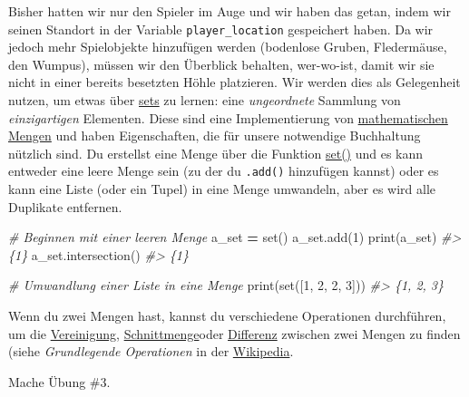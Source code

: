 \documentclass[
]{book}
\newenvironment{Shaded}{\begin{snugshade}}{\end{snugshade}}
\newcommand{\BuiltInTok}[1]{#1}
\newcommand{\CommentTok}[1]{\textcolor[rgb]{0.56,0.35,0.01}{\textit{#1}}}
\newcommand{\DecValTok}[1]{\textcolor[rgb]{0.00,0.00,0.81}{#1}}
\newcommand{\NormalTok}[1]{#1}
\newcommand{\OperatorTok}[1]{\textcolor[rgb]{0.81,0.36,0.00}{\textbf{#1}}}
\begin{document}
Bisher hatten wir nur den Spieler im Auge und wir haben das getan, indem wir seinen Standort in der Variable \texttt{player\_location} gespeichert haben. Da wir jedoch mehr Spielobjekte hinzufügen werden (bodenlose Gruben, Fledermäuse, den Wumpus), müssen wir den Überblick behalten, wer-wo-ist, damit wir sie nicht in einer bereits besetzten Höhle platzieren. Wir werden dies als Gelegenheit nutzen, um etwas über \href{https://docs.python.org/3/library/stdtypes.html\#set-types-set-frozenset}{sets} zu lernen: eine \emph{ungeordnete} Sammlung von \emph{einzigartigen} Elementen. Diese sind eine Implementierung von \href{https://de.wikipedia.org/wiki/Menge_(Mathematik)}{mathematischen Mengen} und haben Eigenschaften, die für unsere notwendige Buchhaltung nützlich sind. Du erstellst eine Menge über die Funktion \href{https://docs.python.org/3/library/stdtypes.html\#set}{set()} und es kann entweder eine leere Menge sein (zu der du \texttt{.add()} hinzufügen kannst) oder es kann eine Liste (oder ein Tupel) in eine Menge umwandeln, aber es wird alle Duplikate entfernen.

\begin{Shaded}
\begin{Highlighting}[]
\CommentTok{\# Beginnen mit einer leeren Menge}
\NormalTok{a\_set }\OperatorTok{=} \BuiltInTok{set}\NormalTok{()}
\NormalTok{a\_set.add(}\DecValTok{1}\NormalTok{)}
\BuiltInTok{print}\NormalTok{(a\_set)}
\CommentTok{\#\textgreater{} \{1\}}
\NormalTok{a\_set.intersection()}
\CommentTok{\#\textgreater{} \{1\}}

\CommentTok{\# Umwandlung einer Liste in eine Menge}
\BuiltInTok{print}\NormalTok{(}\BuiltInTok{set}\NormalTok{([}\DecValTok{1}\NormalTok{, }\DecValTok{2}\NormalTok{, }\DecValTok{2}\NormalTok{, }\DecValTok{3}\NormalTok{]))}
\CommentTok{\#\textgreater{} \{1, 2, 3\}}
\end{Highlighting}
\end{Shaded}

Wenn du zwei Mengen hast, kannst du verschiedene Operationen durchführen, um die \href{https://docs.python.org/3/library/stdtypes.html\#frozenset.union}{Vereinigung}, \href{https://docs.python.org/3/library/stdtypes.html\#frozenset.intersection}{Schnittmenge}oder \href{https://docs.python.org/3/library/stdtypes.html\#frozenset.difference}{Differenz} zwischen zwei Mengen zu finden (siehe \emph{Grundlegende Operationen} in der \href{https://de.wikipedia.org/wiki/Menge_(Mathematik)}{Wikipedia}.

Mache Übung \#3.
\end{document}
